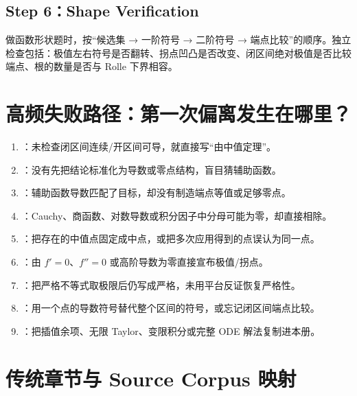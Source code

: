 \documentclass[UTF8,fontset=none,11pt,a4paper]{ctexart}
\begin{document}
\subsection{Step 6：Shape Verification}

做函数形状题时，按“候选集 → 一阶符号 → 二阶符号 → 端点比较”的顺序。独立检查包括：极值左右符号是否翻转、拐点凹凸是否改变、闭区间绝对极值是否比较端点、根的数量是否与 Rolle 下界相容。

\section{高频失败路径：第一次偏离发生在哪里？}

\begin{enumerate}
  \item {}：未检查闭区间连续/开区间可导，就直接写“由中值定理”。
  \item {}：没有先把结论标准化为导数或零点结构，盲目猜辅助函数。
  \item {}：辅助函数导数匹配了目标，却没有制造端点等值或足够零点。
  \item {}：Cauchy、商函数、对数导数或积分因子中分母可能为零，却直接相除。
  \item {}：把存在的中值点固定成中点，或把多次应用得到的点误认为同一点。
  \item {}：由 $f'=0$、$f''=0$ 或高阶导数为零直接宣布极值/拐点。
  \item {}：把严格不等式取极限后仍写成严格，未用平台反证恢复严格性。
  \item {}：用一个点的导数符号替代整个区间的符号，或忘记闭区间端点比较。
  \item {}：把插值余项、无限 Taylor、变限积分或完整 ODE 解法复制进本册。
\end{enumerate}

\section{传统章节与 Source Corpus 映射}
\end{document}
